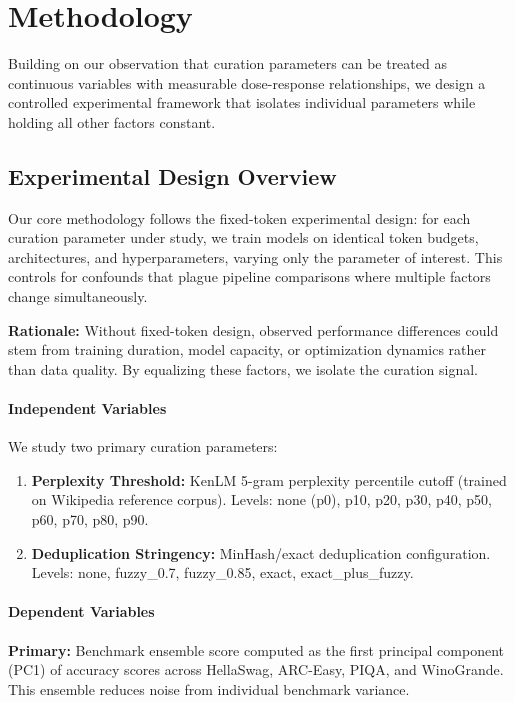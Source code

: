 \section{Methodology}
\label{sec:methodology}

Building on our observation that curation parameters can be treated as continuous variables with measurable dose-response relationships, we design a controlled experimental framework that isolates individual parameters while holding all other factors constant.

\subsection{Experimental Design Overview}

Our core methodology follows the fixed-token experimental design: for each curation parameter under study, we train models on identical token budgets, architectures, and hyperparameters, varying only the parameter of interest. This controls for confounds that plague pipeline comparisons where multiple factors change simultaneously.

\textbf{Rationale:} Without fixed-token design, observed performance differences could stem from training duration, model capacity, or optimization dynamics rather than data quality. By equalizing these factors, we isolate the curation signal.

\paragraph{Independent Variables}
We study two primary curation parameters:
\begin{enumerate}
    \item \textbf{Perplexity Threshold:} KenLM 5-gram perplexity percentile cutoff (trained on Wikipedia reference corpus). Levels: none (p0), p10, p20, p30, p40, p50, p60, p70, p80, p90.
    \item \textbf{Deduplication Stringency:} MinHash/exact deduplication configuration. Levels: none, fuzzy\_0.7, fuzzy\_0.85, exact, exact\_plus\_fuzzy.
\end{enumerate}

\paragraph{Dependent Variables}
\textbf{Primary:} Benchmark ensemble score computed as the first principal component (PC1) of accuracy scores across HellaSwag, ARC-Easy, PIQA, and WinoGrande. This ensemble reduces noise from individual benchmark variance.

